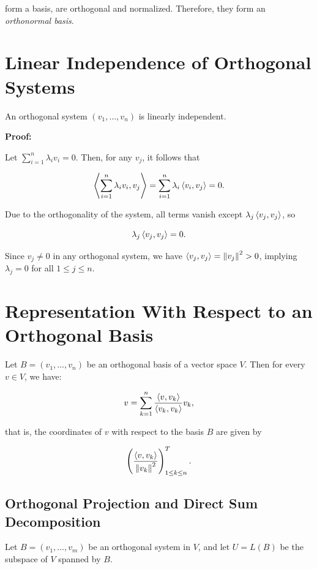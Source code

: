 form a basis, are orthogonal and normalized. Therefore, they form an \emph{orthonormal basis}.

\section{Linear Independence of Orthogonal Systems}

An orthogonal system \( (v_1, \ldots, v_n) \) is linearly independent.

\textbf{Proof:} 

Let \( \sum_{i=1}^n \lambda_i v_i = 0 \). Then, for any \( v_j \), it follows that

\[
    \left\langle\sum_{i=1}^n \lambda_i v_i, v_j\right\rangle = \sum_{i=1}^n \lambda_i \left\langle v_i, v_j\right\rangle = 0.
\]

Due to the orthogonality of the system, all terms vanish except \( \lambda_j \left\langle v_j, v_j\right\rangle \), 
so

\[
    \lambda_j \left\langle v_j, v_j\right\rangle = 0.
\]

Since \( v_j \neq 0 \) in any orthogonal system, we have \( \left\langle v_j, v_j\right\rangle = \left\| v_j \right\|^2 > 0 \), 
implying \( \lambda_j = 0 \) for all \( 1 \leq j \leq n \).

\QED

\section{Representation With Respect to an Orthogonal Basis}

Let \( B = (v_1, \ldots, v_n) \) be an orthogonal basis of a vector space \( V \). Then for every 
\( v \in V \), we have:

\[
    v = \sum_{k=1}^n \frac{\left\langle v, v_k\right\rangle}{\left\langle v_k, v_k\right\rangle} v_k,
\]

that is, the coordinates of \( v \) with respect to the basis \(B\) are given by

\[
    \left( \frac{\left\langle v, v_k\right\rangle}{\left\| v_k \right\|^2} \right)_{1 \leq k \leq n}^T.
\]

\subsection{Orthogonal Projection and Direct Sum Decomposition}

Let \( B = (v_1, \ldots, v_m) \) be an orthogonal system in \( V \), and let \( U = L(B) \) be the 
subspace of \( V \) spanned by \(B\).

